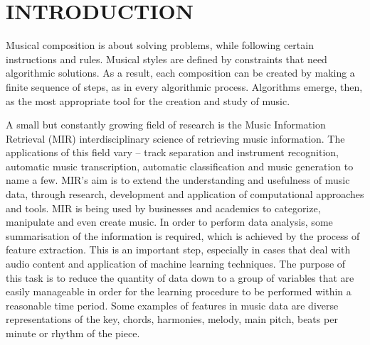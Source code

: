 \chapter{INTRODUCTION}
    Musical composition is about solving problems, while following certain instructions and rules. Musical styles are defined by constraints that need algorithmic solutions. As a result, each composition can be created by making a finite sequence of steps, as in every algorithmic process. Algorithms emerge, then, as the most appropriate tool for the creation and study of music. 
    
    A small but constantly growing field of research is the Music Information Retrieval (MIR) interdisciplinary science of retrieving music information. The applications of this field vary -- track separation and instrument recognition, automatic music transcription, automatic classification and music generation to name a few. MIR's aim is to extend the understanding and usefulness of music data, through research, development and application of computational approaches and tools. MIR is being used by businesses and academics to categorize, manipulate and even create music. %
    In order to perform data analysis, some summarisation of the information is required, which is achieved by the process of feature extraction. This is an important step, especially in cases that deal with audio content and application of machine learning techniques. The purpose of this task is to reduce the quantity of data down to a group of variables that are easily manageable in order for the learning procedure to be performed within a reasonable time period. Some examples of features in music data are diverse representations of the key, chords, harmonies, melody, main pitch, beats per minute or rhythm of the piece.

